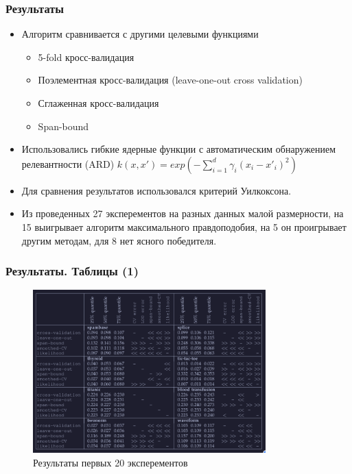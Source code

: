\documentclass{beamer}
\begin{document}
\begin{frame}
	\frametitle{Результаты}
	\begin{itemize}
		\item Алгоритм сравнивается с другими целевыми функциями
		      \begin{itemize}
			      \item 5-fold кросс-валидация
			      \item Поэлементная кросс-валидация (leave-one-out cross validation)
			      \item Сглаженная кросс-валидация
			      \item Span-bound
		      \end{itemize}
		\item Использовались гибкие ядерные функции с автоматическим
		      обнаружением релевантности (ARD)
		      $k(x, x') = exp(- \sum_{i=1}^{d}\gamma_i (x_i - x'_i)^2)$

		\item Для сравнения результатов использовался критерий Уилкоксона.

		\item Из проведенных 27 эксперементов на разных данных малой
		      размерности, на 15 выигрывает алгоритм максимального правдоподобия,
		      на 5 он проигрывает другим методам, для 8 нет ясного победителя.
	\end{itemize}
\end{frame}

\begin{frame}
	\frametitle{Результаты. Таблицы (1)}

	\begin{figure}[h]
		\centering

		\includegraphics[width=0.8\textwidth]{winner.png}
		\caption{Результаты первых 20 эксперементов}
	\end{figure}



\end{frame}
\end{document}
